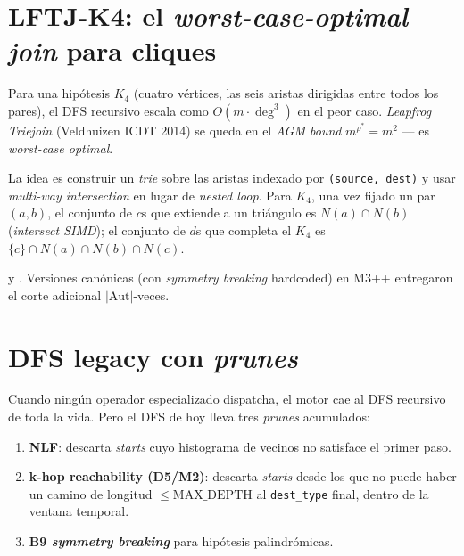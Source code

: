\section{LFTJ-K4: el \emph{worst-case-optimal join} para cliques}

Para una hipótesis \(K_4\) (cuatro vértices, las seis aristas
dirigidas entre todos los pares), el DFS recursivo escala como
\(O(m \cdot \deg^3)\) en el peor caso. \emph{Leapfrog Triejoin}
(Veldhuizen ICDT 2014) se queda en el \emph{AGM bound} \(m^{\rho^*} =
m^2\) — es \emph{worst-case optimal}.

\begin{intuicion}
La idea es construir un \emph{trie} sobre las aristas indexado por
\texttt{(source, dest)} y usar \emph{multi-way intersection} en lugar
de \emph{nested loop}. Para \(K_4\), una vez fijado un par
\((a, b)\), el conjunto de \(c\)s que extiende a un triángulo es
\(N(a) \cap N(b)\) (\emph{intersect SIMD}); el conjunto de \(d\)s que
completa el \(K_4\) es \(\{c\} \cap N(a) \cap N(b) \cap N(c)\).
\end{intuicion}

\begin{enelcodigo}
 y
. Versiones canónicas
(con \emph{symmetry breaking} hardcoded) en M3++ entregaron el corte
adicional \(|\mathrm{Aut}|\)-veces.
\end{enelcodigo}

\section{DFS legacy con \emph{prunes}}

Cuando ningún operador especializado dispatcha, el motor cae al DFS
recursivo de toda la vida. Pero el DFS de hoy lleva tres \emph{prunes}
acumulados:

\begin{enumerate}
    \item \textbf{NLF}: descarta \emph{starts} cuyo histograma de
    vecinos no satisface el primer paso.
    \item \textbf{k-hop reachability (D5/M2)}: descarta \emph{starts}
    desde los que no puede haber un camino de longitud
    \(\leq \mathrm{MAX\_DEPTH}\) al \texttt{dest\_type} final, dentro
    de la ventana temporal.
    \item \textbf{B9 \emph{symmetry breaking}} para hipótesis
    palindrómicas.
\end{enumerate}


